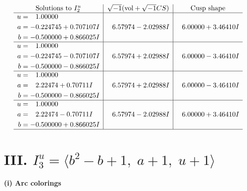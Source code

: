 \documentclass[1p]{elsarticle_modified}
\theoremstyle{definition}
\newcommand{\I}{\sqrt{-1}}
\begin{document}
$$\begin{array}{c|c|c}  
\text{Solutions to }I^u_{2}& \I (\text{vol} + \sqrt{-1}CS) & \text{Cusp shape}\\
 \hline 
\begin{aligned}
u &= \phantom{-}1.00000\phantom{ +0.000000I} \\
a &= -0.224745 + 0.707107 I \\
b &= -0.500000 + 0.866025 I\end{aligned}
 & \phantom{-}6.57974 - 2.02988 I & \phantom{-}6.00000 + 3.46410 I \\ \hline\begin{aligned}
u &= \phantom{-}1.00000\phantom{ +0.000000I} \\
a &= -0.224745 - 0.707107 I \\
b &= -0.500000 - 0.866025 I\end{aligned}
 & \phantom{-}6.57974 + 2.02988 I & \phantom{-}6.00000 - 3.46410 I \\ \hline\begin{aligned}
u &= \phantom{-}1.00000\phantom{ +0.000000I} \\
a &= \phantom{-}2.22474 + 0.70711 I \\
b &= -0.500000 - 0.866025 I\end{aligned}
 & \phantom{-}6.57974 + 2.02988 I & \phantom{-}6.00000 - 3.46410 I \\ \hline\begin{aligned}
u &= \phantom{-}1.00000\phantom{ +0.000000I} \\
a &= \phantom{-}2.22474 - 0.70711 I \\
b &= -0.500000 + 0.866025 I\end{aligned}
 & \phantom{-}6.57974 - 2.02988 I & \phantom{-}6.00000 + 3.46410 I\\
 \hline 
 \end{array}$$\newpage\newpage\renewcommand{\arraystretch}{1}
\centering \section*{III. $I^u_{3}= \langle b^2- b+1,\;a+1,\;u+1 \rangle$}
\flushleft \textbf{(i) Arc colorings}\\
\end{document}
